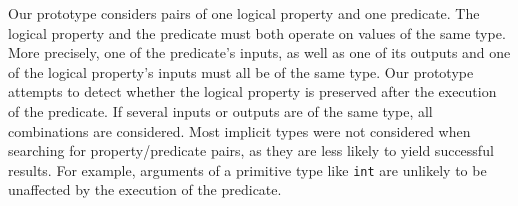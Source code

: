 \documentclass[11pt]{article}
\begin{document}
Our prototype considers pairs of one  logical property and one predicate. The
logical property  and the predicate must  both operate on values  of the same
type. More precisely,  one of the predicate's  inputs, as well as  one of its
outputs and one of the logical property's inputs must all be of the same type.
Our prototype  attempts to detect  whether the logical property  is preserved
after the execution  of the predicate. If several inputs  or outputs are of the
same type,  all combinations are  considered.  Most implicit types  were not
considered %
when searching for property/predicate pairs, as they are less likely to yield
successful results.  For example, arguments of a primitive type like
\texttt{int}  are unlikely  to be  unaffected  by the  execution of  the
predicate.

\end{document}
